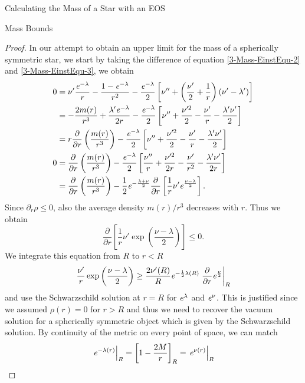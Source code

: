 \begin{section}{Calculating the Mass of a Star with an EOS}
\begin{subsection}{Mass Bounds}
\begin{proof}
	In our attempt to obtain an upper limit for the mass of a spherically symmetric star, we start by taking the difference of equation \eqref{3-Mass-EinstEqu-2} and \eqref{3-Mass-EinstEqu-3}, we obtain 
	\begin{align}
		0 &= \nu'\frac{\mathit{e}^{-\lambda}}{r} - \frac{1-\mathit{e}^{-\lambda}}{r^2} - \frac{\mathit{e}^{-\lambda}}{2}\left[\nu''+\left(\frac{\nu'}{2} + \frac{1}{r}\right)\left(\nu'-\lambda'\right) \right]\\
		&= - \frac{2m(r)}{r^3} + \frac{\lambda'\mathit{e}^{-\lambda}}{2r} -  \frac{\mathit{e}^{-\lambda}}{2}\left[\nu''+ \frac{\nu'^2}{2} - \frac{\nu'}{r} -\frac{\lambda'\nu'}{2}\right]\\
		&= r\frac{\partial}{\partial r}\left(\frac{m(r)}{r^3}\right) - \frac{\mathit{e}^{-\lambda}}{2}\left[\nu''+ \frac{\nu'^2}{2} - \frac{\nu'}{r} -\frac{\lambda'\nu'}{2}\right]\\
		0 &= \frac{\partial}{\partial r}\left(\frac{m(r)}{r^3}\right) - \frac{\mathit{e}^{-\lambda}}{2}\left[\frac{\nu''}{r}+ \frac{\nu'^2}{2r} - \frac{\nu'}{r^2} -\frac{\lambda'\nu'}{2r}\right]\\
		&= \frac{\partial}{\partial r}\left(\frac{m(r)}{r^3}\right) - \frac{1}{2}\mathit{e}^{-\frac{\lambda+\nu}{2}}\frac{\partial}{\partial r}\left[\frac{1}{r}\nu'\mathit{e}^{\frac{\nu-\lambda}{2}}\right].
	\end{align}
	Since $\partial_r\rho\leq0$, also the average density $m(r)/r^3$ decreases with $r$. Thus we obtain
	\begin{equation}
		\frac{\partial}{\partial r}\left[\frac{1}{r}\nu'\exp\left(\frac{\nu-\lambda}{2}\right) \right] \leq 0.
	\end{equation}
	We integrate this equation from $R$ to $r<R$
	\begin{equation}
		\frac{\nu'}{r}\exp\left(\frac{\nu-\lambda}{2}\right)\geq\frac{2\nu'(R)}{R}\mathit{e}^{-\frac{1}{2}\lambda(R)}\left.\frac{\partial}{\partial r}\mathit{e}^{\frac{\nu}{2}}\right|_R
	\end{equation}
	and use the Schwarzschild solution at $r=R$ for $\mathit{e}^\lambda$ and $\mathit{e}^\nu$. 
	This is justified since we assumed $\rho(r)=0$ for $r>R$ and thus we need to recover the vacuum solution for a spherically symmetric object which is given by the Schwarzschild solution. 
	By continuity of the metric on every point of space, we can match 
	\begin{equation}
		\left.\mathit{e}^{-\lambda(r)}\right|_R=\left[1-\frac{2M}{r}\right]_R=\left.\mathit{e}^{\nu(r)}\right|_R
		\label{3-Mass-MassLimitApprox1}
	\end{equation}

\end{proof}
\end{subsection}
\end{section}

